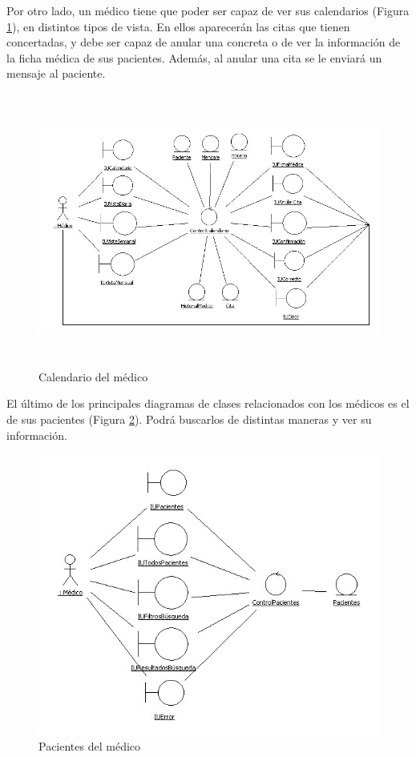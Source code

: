 \documentclass[a4paper,oneside,11pt]{book}
\begin{document}
		Por otro lado, un médico tiene que poder ser capaz de ver sus calendarios (Figura \ref{fig:col_clase5}), en distintos tipos de vista. En ellos aparecerán las citas que tienen concertadas, y debe ser capaz de anular una concreta o de ver la información de la ficha médica de sus pacientes. Además, al anular una cita se le enviará un mensaje al paciente.
		\begin{figure}[H]
		  \centering
		    \includegraphics[width=16cm, height=9cm]{img/jpg/clases/5_CalendarioMedico.jpg}
		  \caption{Calendario del médico}
		  \label{fig:col_clase5}
		\end{figure}
		
		
		El último de los principales diagramas de clases relacionados con los médicos es el de sus pacientes (Figura \ref{fig:col_clase6}). Podrá buscarlos de distintas maneras y ver su información.
		\begin{figure}[H]
		  \centering
		    \includegraphics[width=16cm]{img/jpg/clases/6_MedicosPacientes.jpg}
		  \caption{Pacientes del médico}
		  \label{fig:col_clase6}
		\end{figure}
	
\end{document}
